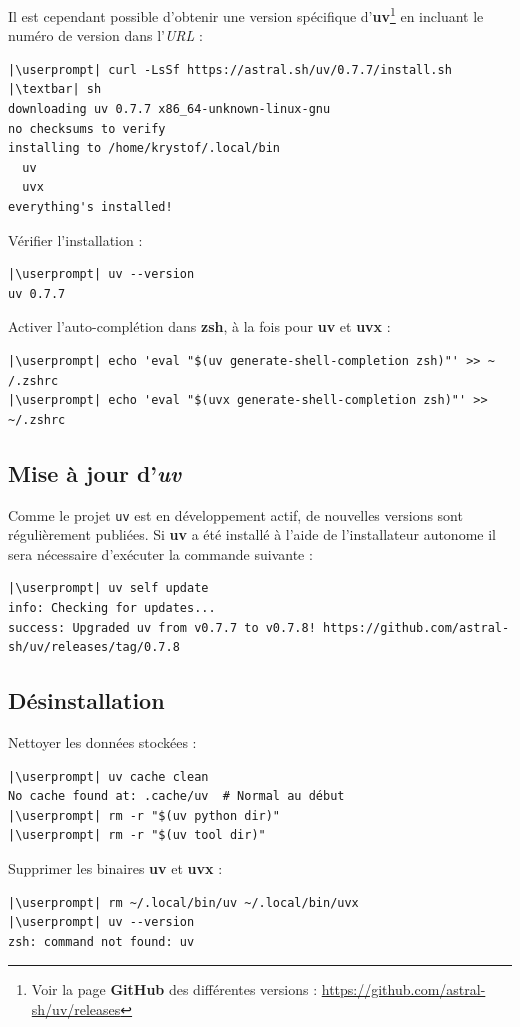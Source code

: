 Il est cependant possible d'obtenir une version spécifique d'\textbf{uv}\footnote{Voir la page \textbf{GitHub} des différentes versions : \url{https://github.com/astral-sh/uv/releases}} en incluant le numéro de version dans l'\textit{URL} :
\begin{lstlisting}[style=bash]
|\userprompt| curl -LsSf https://astral.sh/uv/0.7.7/install.sh |\textbar| sh
downloading uv 0.7.7 x86_64-unknown-linux-gnu
no checksums to verify
installing to /home/krystof/.local/bin
  uv
  uvx
everything's installed!
\end{lstlisting}

Vérifier l'installation :
\begin{lstlisting}[style=bash]
|\userprompt| uv --version 
uv 0.7.7
\end{lstlisting}

Activer l'auto-complétion dans \textbf{zsh}, à la fois pour \textbf{uv} et \textbf{uvx} :
\begin{lstlisting}[style=bash]
|\userprompt| echo 'eval "$(uv generate-shell-completion zsh)"' >> ~ /.zshrc
|\userprompt| echo 'eval "$(uvx generate-shell-completion zsh)"' >> ~/.zshrc
\end{lstlisting}

\subsection*{Mise à jour d'\textit{uv}}
Comme le projet \texttt{uv} est en développement actif, de nouvelles versions sont régulièrement publiées. Si \textbf{uv} a été installé à l'aide de l'installateur autonome il sera nécessaire d'exécuter la commande suivante :
\begin{lstlisting}[style=bash]
|\userprompt| uv self update
info: Checking for updates...
success: Upgraded uv from v0.7.7 to v0.7.8! https://github.com/astral-sh/uv/releases/tag/0.7.8
\end{lstlisting}

\subsection*{Désinstallation}
Nettoyer les données stockées :
\begin{lstlisting}[style=bash]
|\userprompt| uv cache clean
No cache found at: .cache/uv  # Normal au début
|\userprompt| rm -r "$(uv python dir)"
|\userprompt| rm -r "$(uv tool dir)"
\end{lstlisting}

Supprimer les binaires \textbf{uv} et \textbf{uvx} :
\begin{lstlisting}[style=bash]
|\userprompt| rm ~/.local/bin/uv ~/.local/bin/uvx
|\userprompt| uv --version
zsh: command not found: uv
\end{lstlisting}

